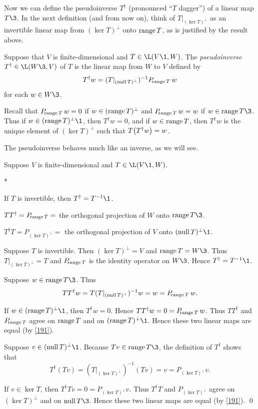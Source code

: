 
Now we can define the pseudoinverse $T^\dagger$ (pronounced ``$T$ dagger'') of a linear map $T\3$. In the next definition (and from now on), think of $T|_{(\ker T)^\perp}$ as an invertible linear map from $(\ker T)^\perp$ onto $\ran T$, as is justified by the result above.

{Suppose that $V$ is finite-dimensional and $T \in \L(V\1, W)$. The \emph{pseudoinverse} $T^\dagger \in \L(W\3, V)$ of $T$ is the linear map from $W$ to $V$ defined by
\[
T^\dagger w = (T|_{(\ker T)^\perp})^{-1} P_{\!\ran T} \, w
\]
for each $w \in W\3$.}

Recall that $P_{\!\ran T} \, w = 0$ if $w \in (\ran T)^\perp$ and $P_{\!\ran T} \, w = w$ if $w \in \ran T\3$. Thus if $w \in (\ran T)^\perp\1$, then $T^\dagger w = 0$, and if $w \in \ran T$, then $T^\dagger w$ is the unique element of $(\ker T)^\perp$ such that
$T \paren[\big] {T^\dagger w} = w$.

The pseudoinverse behaves much like an inverse, as we will see.

{Suppose $V$ is finite-dimensional and $T \in \L(V\1,W)$.
\begin{subtheorem}*
\item
If $T$ is invertible, then $T^\dagger = T^{-1}\1$.
\item
$TT^\dagger = P_{\!\ran T} =$ the orthogonal projection of $W$ onto $\ran T\3$.
\item
$T^\dagger T = P_{\!(\ker T)^\perp} =$ the orthogonal projection of $V$ onto $(\ker T)^\perp\1$.
\end{subtheorem}}

\proof
\begin{subtheorem} \addtolength{\itemsep}{-2bp}
\item
Suppose $T$ is invertible. Then $(\ker T)^\perp = V$ and $\ran T = W\3$. Thus $T|_{(\ker T)^\perp}= T$ and $P_{\!\ran T}$ is the identity operator on $W\3$. Hence $T^\dagger = T^{-1}\1$.

\item
Suppose $w \in \ran T\3$. Thus
\[
T T^\dagger w = T (T|_{(\ker T)^\perp})^{-1} w = w = P_{\!\ran T} \, w.
\]

If $w \in (\ran T)^\perp\1$, then $T^\dagger w = 0$. Hence $TT^\dagger w = 0 = P_{\!\ran T} \, w$.
Thus $TT^\dagger$ and $P_{\!\ran T}$ agree on $\ran T$ and on $(\ran T)^\perp\1$. Hence these two linear maps are equal (by \ref{191}).

\item
Suppose $v \in (\ker T)^\perp\1$. Because $Tv \in \ran T\3$, the definition of $T^\dagger$ shows that
\[
T^\dagger(Tv)= (T|_{(\ker T)^\perp})^{-1} (Tv) = v = P_{\!(\ker T)^\perp} v.
\]

If $v \in \ker T$, then $T^\dagger T v = 0 = P_{\!(\ker T)^\perp} v$.
Thus $T^\dagger T$ and $P_{\!(\ker T)^\perp}$ agree on $(\ker T)^\perp$ and on $\ker T\3$. Hence these two linear maps are equal (by \ref{191}).
\qed
\end{subtheorem}

